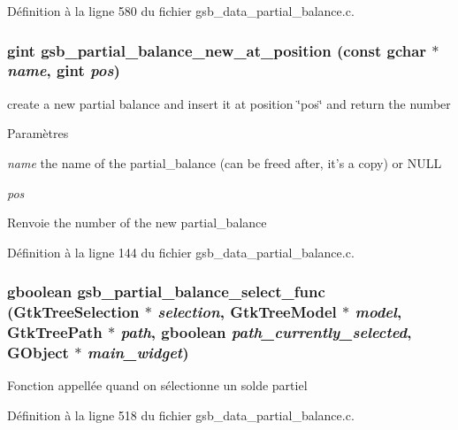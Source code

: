 Définition à la ligne 580 du fichier gsb\_\-data\_\-partial\_\-balance.c.

\subsubsection[{gsb\_\-partial\_\-balance\_\-new\_\-at\_\-position}]{\setlength{\rightskip}{0pt plus 5cm}gint gsb\_\-partial\_\-balance\_\-new\_\-at\_\-position (const gchar $\ast$ {\em name}, \/  gint {\em pos})}\label{gsb__data__partial__balance_8h_a6b7468f19714666d0e109e82c1e2250a}
create a new partial balance and insert it at position \char`\"{}pos\char`\"{} and return the number


\begin{DoxyParams}{Paramètres}
\item[{\em name}]the name of the partial\_\-balance (can be freed after, it's a copy) or NULL \item[{\em pos}]\end{DoxyParams}
\begin{DoxyReturn}{Renvoie}
the number of the new partial\_\-balance 
\end{DoxyReturn}


Définition à la ligne 144 du fichier gsb\_\-data\_\-partial\_\-balance.c.

\subsubsection[{gsb\_\-partial\_\-balance\_\-select\_\-func}]{\setlength{\rightskip}{0pt plus 5cm}gboolean gsb\_\-partial\_\-balance\_\-select\_\-func (GtkTreeSelection $\ast$ {\em selection}, \/  GtkTreeModel $\ast$ {\em model}, \/  GtkTreePath $\ast$ {\em path}, \/  gboolean {\em path\_\-currently\_\-selected}, \/  GObject $\ast$ {\em main\_\-widget})}\label{gsb__data__partial__balance_8h_a41445613bc74e7cec65115a097e486fa}
Fonction appellée quand on sélectionne un solde partiel 

Définition à la ligne 518 du fichier gsb\_\-data\_\-partial\_\-balance.c.

